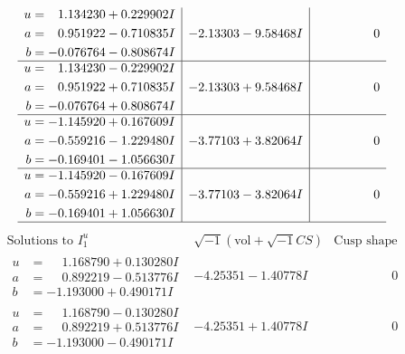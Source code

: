 \documentclass[1p]{elsarticle_modified}
\theoremstyle{definition}
\newcommand{\I}{\sqrt{-1}}
\begin{document}
$$\begin{array}{c|c|c}
\begin{aligned}
u &= \phantom{-}1.134230 + 0.229902 I \\
a &= \phantom{-}0.951922 - 0.710835 I \\
b &= -0.076764 - 0.808674 I\end{aligned}
 & -2.13303 - 9.58468 I & \phantom{-0.000000 } 0 \\ \hline\begin{aligned}
u &= \phantom{-}1.134230 - 0.229902 I \\
a &= \phantom{-}0.951922 + 0.710835 I \\
b &= -0.076764 + 0.808674 I\end{aligned}
 & -2.13303 + 9.58468 I & \phantom{-0.000000 } 0 \\ \hline\begin{aligned}
u &= -1.145920 + 0.167609 I \\
a &= -0.559216 - 1.229480 I \\
b &= -0.169401 - 1.056630 I\end{aligned}
 & -3.77103 + 3.82064 I & \phantom{-0.000000 } 0 \\ \hline\begin{aligned}
u &= -1.145920 - 0.167609 I \\
a &= -0.559216 + 1.229480 I \\
b &= -0.169401 + 1.056630 I\end{aligned}
 & -3.77103 - 3.82064 I & \phantom{-0.000000 } 0\\
 \hline 
 \end{array}$$\newpage$$\begin{array}{c|c|c}  
\text{Solutions to }I^u_{1}& \I (\text{vol} + \sqrt{-1}CS) & \text{Cusp shape}\\
 \hline 
\begin{aligned}
u &= \phantom{-}1.168790 + 0.130280 I \\
a &= \phantom{-}0.892219 - 0.513776 I \\
b &= -1.193000 + 0.490171 I\end{aligned}
 & -4.25351 - 1.40778 I & \phantom{-0.000000 } 0 \\ \hline\begin{aligned}
u &= \phantom{-}1.168790 - 0.130280 I \\
a &= \phantom{-}0.892219 + 0.513776 I \\
b &= -1.193000 - 0.490171 I\end{aligned}
 & -4.25351 + 1.40778 I & \phantom{-0.000000 } 0 \\ \hline\begin{aligned}

\end{aligned}
\end{array}$$
\end{document}
